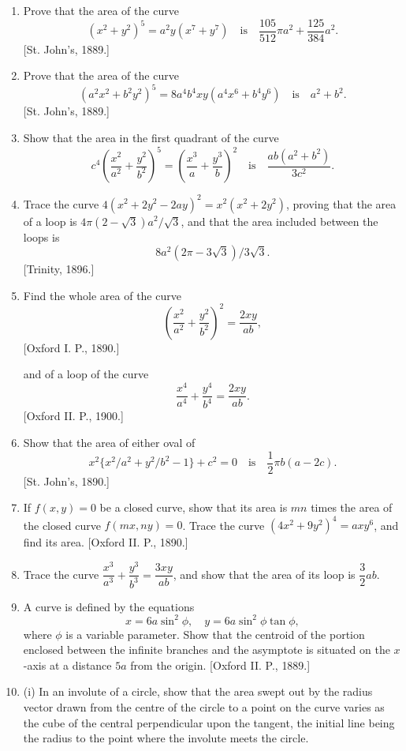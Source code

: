\documentclass[11pt, a4paper]{article}
\newcommand{\source}[1]{\hfill\textnormal{[#1]}}
\begin{document}
\begin{enumerate}[leftmargin=2em]
\item Prove that the area of the curve
\[
(x^2+y^2)^5=a^2y(x^7+y^7)\quad\text{is}\quad\frac{105}{512}\pi a^2+\frac{125}{384}a^2.
\]
\source{St. John's, 1889.}

\item Prove that the area of the curve
\[
(a^2x^2+b^2y^2)^5=8a^4b^4xy(a^4x^6+b^4y^6)\quad\text{is}\quad a^2+b^2.
\]
\source{St. John's, 1889.}

\item Show that the area in the first quadrant of the curve
\[
c^4\left(\frac{x^2}{a^2}+\frac{y^2}{b^2}\right)^5=\left(\frac{x^3}{a}+\frac{y^3}{b}\right)^2\quad\text{is}\quad\frac{ab(a^2+b^2)}{3c^2}.
\]

\item Trace the curve $4(x^2+2y^2-2ay)^2=x^2(x^2+2y^2)$, proving that the area of a loop is $4\pi(2-\sqrt3)a^2/\sqrt3$, and that the area included between the loops is
\[
8a^2(2\pi-3\sqrt3)/3\sqrt3.
\]
\source{Trinity, 1896.}

\item Find the whole area of the curve
\[
\left(\frac{x^2}{a^2}+\frac{y^2}{b^2}\right)^2=\frac{2xy}{ab},
\]
\source{Oxford I. P., 1890.}

and of a loop of the curve
\[
\frac{x^4}{a^4}+\frac{y^4}{b^4}=\frac{2xy}{ab}.
\]
\source{Oxford II. P., 1900.}

\item Show that the area of either oval of
\[
x^2\{x^2/a^2+y^2/b^2-1\}+c^2=0\quad\text{is}\quad\frac12\pi b(a-2c).
\]
\source{St. John's, 1890.}

\item If $f(x,y)=0$ be a closed curve, show that its area is $mn$ times the area of the closed curve $f(mx,ny)=0$. Trace the curve $(4x^2+9y^2)^4=axy^6$, and find its area. \source{Oxford II. P., 1890.}

\item Trace the curve $\dfrac{x^3}{a^3}+\dfrac{y^3}{b^3}=\dfrac{3xy}{ab}$, and show that the area of its loop is $\dfrac32ab$.

\item A curve is defined by the equations
\[
x=6a\sin^2\phi,\quad y=6a\sin^2\phi\tan\phi,
\]
where $\phi$ is a variable parameter. Show that the centroid of the portion enclosed between the infinite branches and the asymptote is situated on the $x$-axis at a distance $5a$ from the origin. \source{Oxford II. P., 1889.}

\item (i) In an involute of a circle, show that the area swept out by the radius vector drawn from the centre of the circle to a point on the curve varies as the cube of the central perpendicular upon the tangent, the initial line being the radius to the point where the involute meets the circle.


\end{enumerate}
\end{document}
